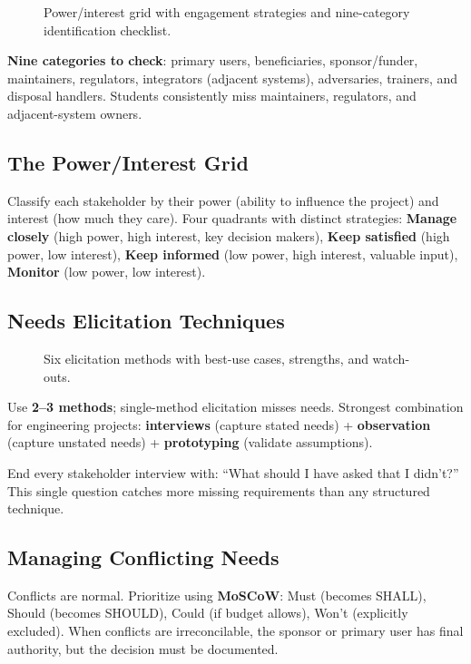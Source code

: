 \begin{figure}[htbp]\centering

\caption{Power/interest grid with engagement strategies and nine-category identification checklist.}\label{fig:stake}
\end{figure}

\textbf{Nine categories to check}: primary users, beneficiaries, sponsor/funder, maintainers, regulators, integrators (adjacent systems), adversaries, trainers, and disposal handlers. Students consistently miss maintainers, regulators, and adjacent-system owners.

\subsection{The Power/Interest Grid}
Classify each stakeholder by their power (ability to influence the project) and interest (how much they care). Four quadrants with distinct strategies: \textbf{Manage closely} (high power, high interest, key decision makers), \textbf{Keep satisfied} (high power, low interest), \textbf{Keep informed} (low power, high interest, valuable input), \textbf{Monitor} (low power, low interest).

\subsection{Needs Elicitation Techniques}

\begin{figure}[htbp]\centering

\caption{Six elicitation methods with best-use cases, strengths, and watch-outs.}\label{fig:elic}
\end{figure}

Use \textbf{2--3 methods}; single-method elicitation misses needs. Strongest combination for engineering projects: \textbf{interviews} (capture stated needs) + \textbf{observation} (capture unstated needs) + \textbf{prototyping} (validate assumptions).

\begin{tipbox}
End every stakeholder interview with: ``What should I have asked that I didn't?'' This single question catches more missing requirements than any structured technique.
\end{tipbox}

\subsection{Managing Conflicting Needs}
Conflicts are normal. Prioritize using \textbf{MoSCoW}: Must (becomes SHALL), Should (becomes SHOULD), Could (if budget allows), Won't (explicitly excluded). When conflicts are irreconcilable, the sponsor or primary user has final authority, but the decision must be documented.

